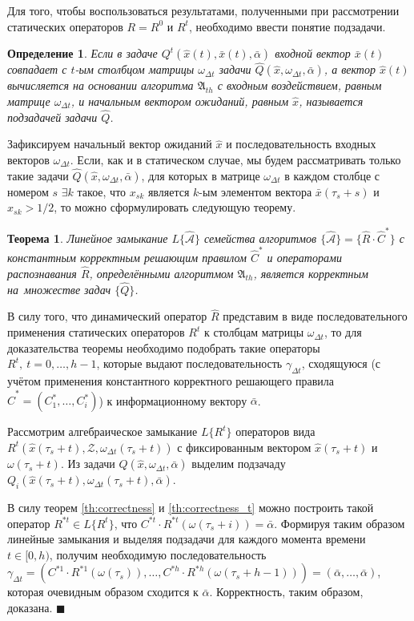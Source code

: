 \documentclass[a4paper, 12pt]{article}
\theoremstyle{plain}
\newtheorem{Theorem}{Теорема}
\newtheorem{Def}{Определение}
\newenvironment{Proof}%
	{\par\noindent{\bf Доказательство.}}%
	{\hfill$\scriptstyle\blacksquare$}
\begin{document}
	Для того, чтобы воспользоваться результатами, полученными при рассмотрении статических операторов $R=R^0$ и $R^t$, необходимо ввести понятие подзадачи.
	
	\begin{Def}
		Если в задаче $Q^t(\hat x(t),\bar x(t),\bar\alpha)$ входной вектор $\bar x(t)$ совпадает с $t$-ым столбцом матрицы $\omega_{\Delta t}$ задачи $\hat Q(\hat x,\omega_{\Delta t},\bar\alpha)$, а вектор $\hat x(t)$ вычисляется на основании алгоритма $\mathfrak A_{th}$ с входным воздействием, равным матрице $\omega_{\Delta t}$, и начальным вектором ожиданий, равным $\hat x$, называется подзадачей задачи $\hat Q$.
	\end{Def}
	
	Зафиксируем начальный вектор ожиданий $\hat{x}$ и последовательность входных векторов $\omega_{\Delta{t}}$. Если, как и в статическом случае, мы будем рассматривать только такие задачи $\hat{Q}(\hat{x},\omega_{\Delta{t}},\bar{\alpha})$, для которых в матрице $\omega_{\Delta{t}}$ в каждом столбце с номером $s$ ${\exists}k$ такое, что $x_{sk}$ является $k$-ым элементом вектора $\bar{x}(\tau_s+s)$ и $x_{sk}>1/2$, то можно сформулировать следующую теорему.
	
	\begin{Theorem}\label{th:correctness_d}
		Линейное замыкание $L\{\hat{\mathcal{A}}\}$ семейства алгоритмов $\{\hat{\mathcal{A}}\}=\{\hat{R}{\cdot}\hat{C}^*\}$ с константным корректным решающим правилом $\hat{C}^*$ и операторами распознавания $\hat{R}$, определёнными алгоритмом $\mathfrak{A}_{th}$, является корректным на~множестве задач $\{\hat{Q}\}$.
	\end{Theorem}
	
	\begin{Proof}
		В силу того, что динамический оператор $\hat{R}$ представим в виде последовательного применения статических операторов $R^t$ к столбцам матрицы $\omega_{\Delta{t}}$, то для доказательства теоремы необходимо подобрать такие операторы $R^t,\ t=0,\dots,h-1$, которые выдают последовательность $\gamma_{\Delta{t}}$, сходящуюся (с учётом применения константного корректного решающего правила $\hat{C}^*=(C_1^*,\dots,C_i^*)$) к информационному вектору $\bar{\alpha}$.
		
		Рассмотрим алгебраическое замыкание $L\{R^t\}$ операторов вида $R^t(\hat{x}(\tau_s+t), \mathcal Z, \omega_{\Delta t}(\tau_s+t))$ с фиксированным вектором $\hat{x}(\tau_s+t)$ и $\omega(\tau_s+t)$. Из задачи $\hat{Q}(\hat{x}, \omega_{{\Delta}t}, \bar{\alpha})$ выделим подзачаду $Q_i(\hat x(\tau_s+t), \omega_{\Delta t}(\tau_s+t),\bar\alpha)$. 

		В силу теорем \ref{th:correctness} и \ref{th:correctness_t} можно построить такой оператор $R^{*t}\in{L}\{R^t\}$, что $C^{*t}\cdot R^{*t}(\omega(\tau_s+i))=\bar{\alpha}$. Формируя таким образом линейные замыкания и выделяя подзадачи для каждого момента времени $t\in[0,h)$, получим необходимую последовательность $\gamma_{\Delta t}=(C^{*1}\cdot R^{*1}(\omega(\tau_s)), \dots, C^{*h}\cdot R^{*h}(\omega(\tau_s+h-1)))=(\bar{\alpha},\dots,\bar{\alpha})$, которая очевидным образом сходится к $\bar{\alpha}$. Корректность, таким образом, доказана.		
	\end{Proof}
	
\end{document}
